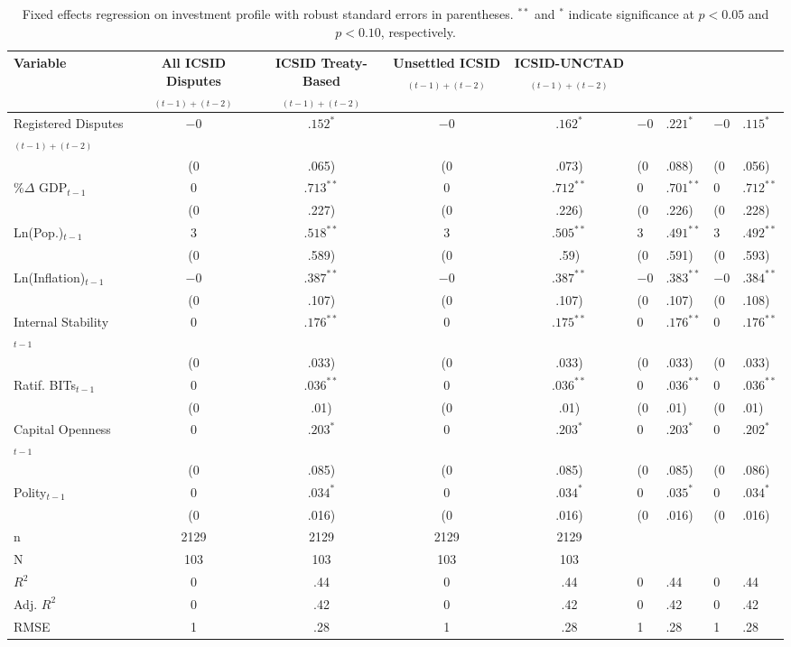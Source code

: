 \begin{table}[ht]
\centering
{\footnotesize
\begin{tabular}{lcccc}
 Variable & All ICSID Disputes$_{(t-1) + (t-2)}$ & ICSID Treaty-Based$_{(t-1) + (t-2)}$ & Unsettled ICSID$_{(t-1) + (t-2)}$ & ICSID-UNCTAD$_{(t-1) + (t-2)}$ \\ 
  \hline
\hline
Registered Disputes$_{(t-1) + (t-2)}$ & $-0$&$.152^{\ast}$ & $-0$&$.162^{\ast}$ & $-0$&$.221^{\ast}$ & $-0$&$.115^{\ast}$ \\ 
   & (0&.065) & (0&.073) & (0&.088) & (0&.056) \\ 
  \%$\Delta$ GDP$_{t-1}$ & $0$&$.713^{\ast\ast}$ & $0$&$.712^{\ast\ast}$ & $0$&$.701^{\ast\ast}$ & $0$&$.712^{\ast\ast}$ \\ 
   & (0&.227) & (0&.226) & (0&.226) & (0&.228) \\ 
  Ln(Pop.)$_{t-1}$ & $3$&$.518^{\ast\ast}$ & $3$&$.505^{\ast\ast}$ & $3$&$.491^{\ast\ast}$ & $3$&$.492^{\ast\ast}$ \\ 
   & (0&.589) & (0&.59) & (0&.591) & (0&.593) \\ 
  Ln(Inflation)$_{t-1}$ & $-0$&$.387^{\ast\ast}$ & $-0$&$.387^{\ast\ast}$ & $-0$&$.383^{\ast\ast}$ & $-0$&$.384^{\ast\ast}$ \\ 
   & (0&.107) & (0&.107) & (0&.107) & (0&.108) \\ 
  Internal Stability$_{t-1}$ & $0$&$.176^{\ast\ast}$ & $0$&$.175^{\ast\ast}$ & $0$&$.176^{\ast\ast}$ & $0$&$.176^{\ast\ast}$ \\ 
   & (0&.033) & (0&.033) & (0&.033) & (0&.033) \\ 
  Ratif. BITs$_{t-1}$ & $0$&$.036^{\ast\ast}$ & $0$&$.036^{\ast\ast}$ & $0$&$.036^{\ast\ast}$ & $0$&$.036^{\ast\ast}$ \\ 
   & (0&.01) & (0&.01) & (0&.01) & (0&.01) \\ 
  Capital Openness$_{t-1}$ & $0$&$.203^{\ast}$ & $0$&$.203^{\ast}$ & $0$&$.203^{\ast}$ & $0$&$.202^{\ast}$ \\ 
   & (0&.085) & (0&.085) & (0&.085) & (0&.086) \\ 
  Polity$_{t-1}$ & $0$&$.034^{\ast}$ & $0$&$.034^{\ast}$ & $0$&$.035^{\ast}$ & $0$&$.034^{\ast}$ \\ 
   & (0&.016) & (0&.016) & (0&.016) & (0&.016) \\ 
   \hline
n & 2129 & 2129 & 2129 & 2129 \\ 
  N & 103 & 103 & 103 & 103 \\ 
  $R^{2}$ & 0&.44 & 0&.44 & 0&.44 & 0&.44 \\ 
  Adj. $R^{2}$ & 0&.42 & 0&.42 & 0&.42 & 0&.42 \\ 
  RMSE & 1&.28 & 1&.28 & 1&.28 & 1&.28 \\ 
   \hline
\hline
\end{tabular}
}
\caption{Fixed effects regression on investment profile with robust standard errors in parentheses. $^{**}$ and $^{*}$ indicate significance at $p< 0.05 $ and $p< 0.10 $, respectively.} 
\end{table}
